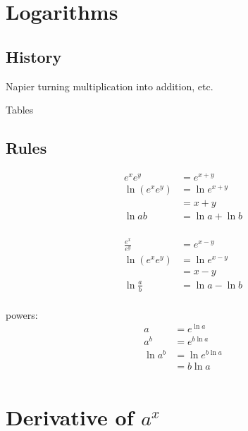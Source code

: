 \documentclass[letterpaper, landscape]{exam}
\begin{document}
  \section{Logarithms} %

  \subsection{History} %
  
  \begin{itemize*}
    \item Napier turning multiplication into addition, etc.
    \item Tables
  \end{itemize*}
  
  \subsection{Rules} %
  
  \begin{align*}
    e^x e^y                    & = e^{x + y} \\
    \ln \left( e^x e^y \right) & = \ln e^{x + y} \\
                               & = x + y
    \\
    \ln ab &= \ln a + \ln b \\
  \end{align*}

  \begin{align*}
    \frac{e^x}{e^y}             & = e^{x - y} \\
    \ln \left( e^x e^y \right)  & = \ln e^{x - y} \\
                                & = x - y
    \\
    \ln \frac{a}{b}             & = \ln a - \ln b \\
  \end{align*}

  powers:
  \begin{align*}
    a       & = e^{\ln a} \\
    a^b     & = e^{b \ln a} \\
    \ln a^b & = \ln e^{b \ln a} \\
            & = b \ln a \\
  \end{align*}

  \section{Derivative of $a^x$} %
\end{document}
